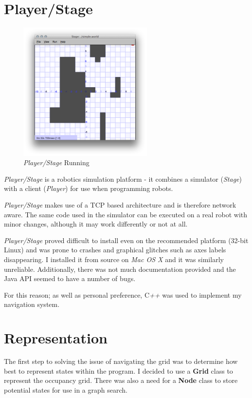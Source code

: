 \documentclass[a4paper,12pt]{article}
\begin{document}
\section{Player/Stage}
\begin{figure}
    \begin{center}
            \includegraphics[width=0.6\textwidth]{images/Start_GUI.png}
            \caption{\textit{Player/Stage} Running}
    \end{center}
\end{figure}
\textit{Player/Stage} is a robotics simulation platform - it combines a simulator (\textit{Stage}) with a client (\textit{Player}) for use when programming robots. 

\textit{Player/Stage} makes use of a TCP based architecture \cite{pstcp} and is therefore network aware. The same code used in the simulator can be executed on a real robot with minor changes, although it may work differently or not at all.

\textit{Player/Stage} proved difficult to install even on the recommended platform (32-bit Linux) and was prone to crashes and graphical glitches such as axes labels disappearing. I installed it from source on \textit{Mac OS X} and it was similarly unreliable. Additionally, there was not much documentation provided and the Java API seemed to have a number of bugs. 

For this reason; as well as personal preference, C\textit{++} was used to implement my navigation system.
\section{Representation}
The first step to solving the issue of navigating the grid was to determine how best to represent states within the program. I decided to use a \textbf{Grid} class to represent the occupancy grid. There was also a need for a \textbf{Node} class to store potential states for use in a graph search. 
\end{document}
